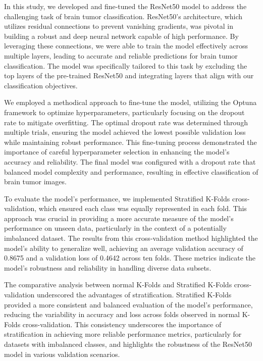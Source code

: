 In this study, we developed and fine-tuned the ResNet50 model to address the challenging task of brain tumor classification. ResNet50's architecture, which utilizes residual connections to prevent vanishing gradients, was pivotal in building a robust and deep neural network capable of high performance. By leveraging these connections, we were able to train the model effectively across multiple layers, leading to accurate and reliable predictions for brain tumor classification. The model was specifically tailored to this task by excluding the top layers of the pre-trained ResNet50 and integrating layers that align with our classification objectives.

We employed a methodical approach to fine-tune the model, utilizing the Optuna framework to optimize hyperparameters, particularly focusing on the dropout rate to mitigate overfitting. The optimal dropout rate was determined through multiple trials, ensuring the model achieved the lowest possible validation loss while maintaining robust performance. This fine-tuning process demonstrated the importance of careful hyperparameter selection in enhancing the model's accuracy and reliability. The final model was configured with a dropout rate that balanced model complexity and performance, resulting in effective classification of brain tumor images.

To evaluate the model's performance, we implemented Stratified K-Folds cross-validation, which ensured each class was equally represented in each fold. This approach was crucial in providing a more accurate measure of the model's performance on unseen data, particularly in the context of a potentially imbalanced dataset. The results from this cross-validation method highlighted the model's ability to generalize well, achieving an average validation accuracy of 0.8675 and a validation loss of 0.4642 across ten folds. These metrics indicate the model's robustness and reliability in handling diverse data subsets.

The comparative analysis between normal K-Folds and Stratified K-Folds cross-validation underscored the advantages of stratification. Stratified K-Folds provided a more consistent and balanced evaluation of the model's performance, reducing the variability in accuracy and loss across folds observed in normal K-Folds cross-validation. This consistency underscores the importance of stratification in achieving more reliable performance metrics, particularly for datasets with imbalanced classes, and highlights the robustness of the ResNet50 model in various validation scenarios.

